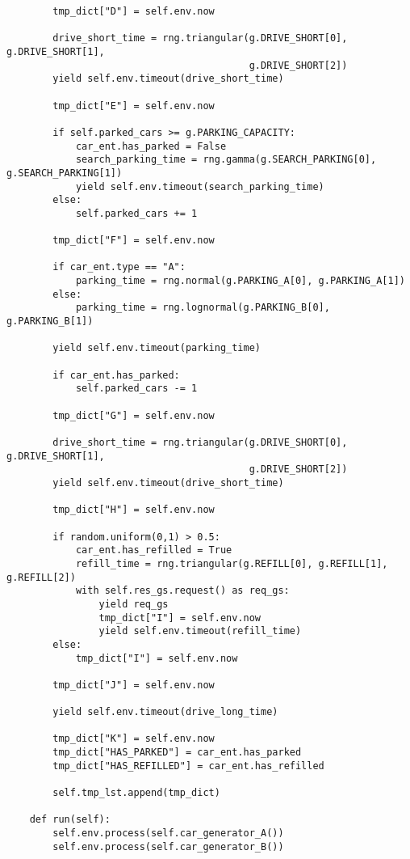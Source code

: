 \begin{verbatim}
        tmp_dict["D"] = self.env.now

        drive_short_time = rng.triangular(g.DRIVE_SHORT[0], g.DRIVE_SHORT[1],
                                          g.DRIVE_SHORT[2])
        yield self.env.timeout(drive_short_time)

        tmp_dict["E"] = self.env.now

        if self.parked_cars >= g.PARKING_CAPACITY:
            car_ent.has_parked = False
            search_parking_time = rng.gamma(g.SEARCH_PARKING[0], g.SEARCH_PARKING[1])
            yield self.env.timeout(search_parking_time)
        else:
            self.parked_cars += 1

        tmp_dict["F"] = self.env.now

        if car_ent.type == "A":
            parking_time = rng.normal(g.PARKING_A[0], g.PARKING_A[1])
        else:
            parking_time = rng.lognormal(g.PARKING_B[0], g.PARKING_B[1])

        yield self.env.timeout(parking_time)

        if car_ent.has_parked:
            self.parked_cars -= 1

        tmp_dict["G"] = self.env.now

        drive_short_time = rng.triangular(g.DRIVE_SHORT[0], g.DRIVE_SHORT[1],
                                          g.DRIVE_SHORT[2])
        yield self.env.timeout(drive_short_time)

        tmp_dict["H"] = self.env.now

        if random.uniform(0,1) > 0.5:
            car_ent.has_refilled = True
            refill_time = rng.triangular(g.REFILL[0], g.REFILL[1], g.REFILL[2])
            with self.res_gs.request() as req_gs:
                yield req_gs
                tmp_dict["I"] = self.env.now
                yield self.env.timeout(refill_time)
        else:
            tmp_dict["I"] = self.env.now

        tmp_dict["J"] = self.env.now

        yield self.env.timeout(drive_long_time)

        tmp_dict["K"] = self.env.now
        tmp_dict["HAS_PARKED"] = car_ent.has_parked
        tmp_dict["HAS_REFILLED"] = car_ent.has_refilled

        self.tmp_lst.append(tmp_dict)

    def run(self):
        self.env.process(self.car_generator_A())
        self.env.process(self.car_generator_B())


\end{verbatim}
